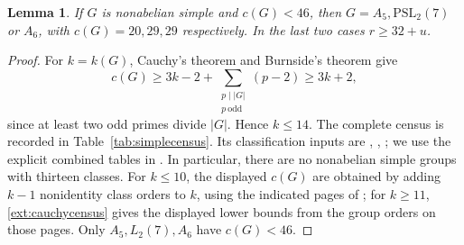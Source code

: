 \documentclass[11pt]{amsart}
\numberwithin{equation}{section}
\newtheorem{lemma}[theorem]{Lemma}
\theoremstyle{definition}
\theoremstyle{plain}
\begin{document}
\begin{lemma}\label{ext:groups}
If $G$ is nonabelian simple and $c(G)<46$, then $G=A_5,\mathrm{PSL}_2(7)$
or $A_6$, with $c(G)=20,29,29$ respectively. In the last two cases $r\ge32+u$.
\end{lemma}
\begin{proof}
For $k=k(G)$, Cauchy's theorem and Burnside's theorem give
\begin{equation}\label{ext:cauchycensus}
 c(G)\ge3k-2+\sum_{\substack{p\mid|G|\\p\ \mathrm{odd}}}(p-2)
 \ge3k+2,
\end{equation}
since at least two odd primes divide $|G|$. Hence $k\le14$.
The complete census is recorded in Table~\ref{tab:simplecensus}.
Its classification inputs are \cite[Tables~I--II]{Landauer},
\cite[\S3]{AK}, \cite{VeraLopez85,VeraLopez86,VeraSang};
we use the explicit combined tables in \cite[\S4]{HM}.
In particular, there are no nonabelian simple groups with thirteen
classes. For $k\le10$, the displayed $c(G)$ are obtained by adding
$k-1$ nonidentity class orders to $k$, using the indicated pages of
\cite{AtlasGroups}; for $k\ge11$, \eqref{ext:cauchycensus}
gives the displayed lower bounds from the group orders on those pages.
Only $A_5,L_2(7),A_6$ have $c(G)<46$.


\end{proof}
\end{document}
